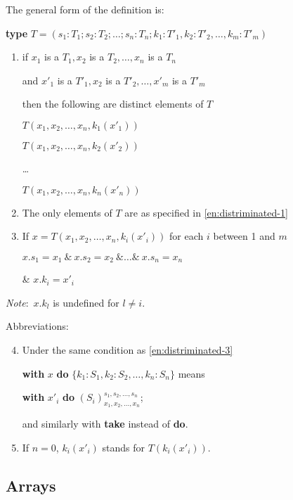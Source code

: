 The general form of the definition is:

\quad \textbf{type} $T = (s_1: T_1; s_2: T_2; \dots ; s_n:T_n; k_1: T'_1, k_2:T'_2, \dots , k_m: T'_m)$

\begin{enumerate}[leftmargin=2\parindent, label=(\arabic*)]
	\item \label{en:distriminated-1}
	if $x_1$ is a $T_1, x_2$ is a $T_2, \dots, x_n$ is a $T_n$
	
	and $x'_1$ is a $T'_1, x_2$ is a $T'_2, \dots, x'_m$ is a $T'_m$
	
	then the following are distinct elements of $T$
	
	$T(x_1, x_2, \dots, x_n, k_1(x'_1))$
	
	$T(x_1, x_2, \dots, x_n, k_2(x'_2))$
	
	\quad \dots
	
	$T(x_1, x_2, \dots, x_n, k_n(x'_n))$

	\item The only elements of $T$ are as specified in \ref{en:distriminated-1}
	
	\item\label{en:distriminated-3}
	If $x = T(x_1, x_2, \dots, x_n, k_i(x'_i))$ for each $i$ between 1 and $m$
	
	\quad $x.s_1 = x_1\ \&\ x.s_2 = x_2\ \& \dots \&\ x.s_n = x_n$
	
	\& $x.k_i = x'_i$
\end{enumerate}

\textit{Note}:\, $x.k_l$ is undefined for $l \neq i.$

\noindent
Abbreviations:

\begin{enumerate}[leftmargin=2\parindent, label=(\arabic*)]
	\setcounter{enumi}{3}
	\item Under the same condition as \ref{en:distriminated-3} 
	
	\textbf{with} $x$ \textbf{do} $\{k_1:S_1, k_2:S_2, \dots, k_n:S_n\}$ means

	\textbf{with} $x'_i$ \textbf{do} $(S_i)_{x_1, x_2, \dots, x_n}^{s_1, s_2, \dots, s_n}$;

	and similarly with \textbf{take} instead of \textbf{do}.

	\item If $n = 0$, $k_i(x'_i)$ stands for $T(k_i(x'_i)).$
\end{enumerate}

\subsection{Arrays}

